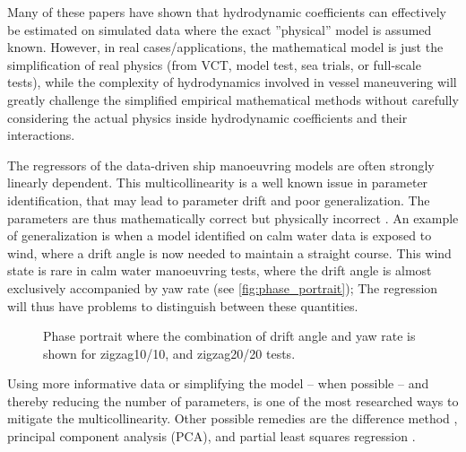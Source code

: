 Many of these papers have shown that hydrodynamic coefficients can effectively be estimated on simulated data where the exact ''physical'' model is assumed known. However, in real cases/applications, the mathematical model is just the simplification of real physics (from VCT, model test, sea trials, or full-scale tests), while the complexity of hydrodynamics involved in vessel maneuvering will greatly challenge the simplified empirical mathematical methods without carefully considering the actual physics inside hydrodynamic coefficients and their interactions. 

%
The regressors of the data-driven ship manoeuvring models are often strongly linearly dependent. This multicollinearity is a well known issue in parameter identification, that may lead to parameter drift and poor generalization. The parameters are thus mathematically correct but physically incorrect \citep{luo_parameter_2016}. 
An example of generalization is when a model identified on calm water data is exposed to wind, where a drift angle is now needed to maintain a straight course. This wind state is rare in calm water manoeuvring tests, where the drift angle is almost exclusively accompanied by yaw rate (see \autoref{fig:phase_portrait}); 
The regression will thus have problems to distinguish between these quantities.
%
\begin{figure}[h]
  \centering
  
  \caption{Phase portrait where the combination of drift angle and yaw rate is shown for zigzag10/10, and zigzag20/20 tests.}
  \label{fig:phase_portrait}
\end{figure}
Using more informative data or simplifying the model -- when possible -- and thereby reducing the number of parameters, is one of the most researched ways to mitigate the multicollinearity. Other possible remedies are the difference method \citep{luo_parameter_2016}, principal component analysis (PCA), and partial least squares regression \citep{jian-chuan_parametric_2015}. 

